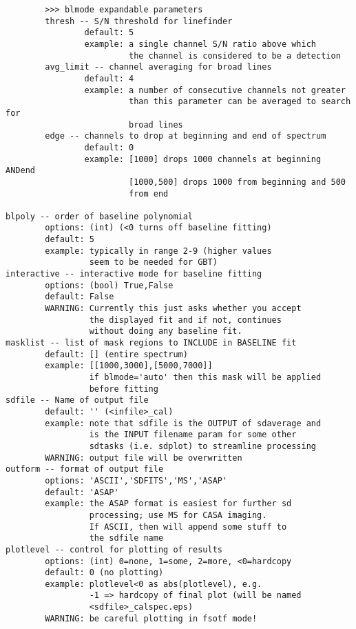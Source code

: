 \begin{verbatim}
        >>> blmode expandable parameters
        thresh -- S/N threshold for linefinder
                default: 5
                example: a single channel S/N ratio above which 
                         the channel is considered to be a detection
        avg_limit -- channel averaging for broad lines
                default: 4
                example: a number of consecutive channels not greater 
                         than this parameter can be averaged to search for 
                         broad lines
        edge -- channels to drop at beginning and end of spectrum
                default: 0
                example: [1000] drops 1000 channels at beginning ANDend
                         [1000,500] drops 1000 from beginning and 500 
                         from end

blpoly -- order of baseline polynomial
        options: (int) (<0 turns off baseline fitting)
        default: 5
        example: typically in range 2-9 (higher values
                 seem to be needed for GBT)
interactive -- interactive mode for baseline fitting
        options: (bool) True,False
        default: False
        WARNING: Currently this just asks whether you accept
                 the displayed fit and if not, continues
                 without doing any baseline fit.
masklist -- list of mask regions to INCLUDE in BASELINE fit
        default: [] (entire spectrum)
        example: [[1000,3000],[5000,7000]]
                 if blmode='auto' then this mask will be applied
                 before fitting
sdfile -- Name of output file
        default: '' (<infile>_cal)
        example: note that sdfile is the OUTPUT of sdaverage and
                 is the INPUT filename param for some other
                 sdtasks (i.e. sdplot) to streamline processing
        WARNING: output file will be overwritten
outform -- format of output file
        options: 'ASCII','SDFITS','MS','ASAP'
        default: 'ASAP'
        example: the ASAP format is easiest for further sd
                 processing; use MS for CASA imaging.
                 If ASCII, then will append some stuff to
                 the sdfile name
plotlevel -- control for plotting of results
        options: (int) 0=none, 1=some, 2=more, <0=hardcopy
        default: 0 (no plotting)
        example: plotlevel<0 as abs(plotlevel), e.g.
                 -1 => hardcopy of final plot (will be named
                 <sdfile>_calspec.eps)
        WARNING: be careful plotting in fsotf mode!
\end{verbatim}
    
